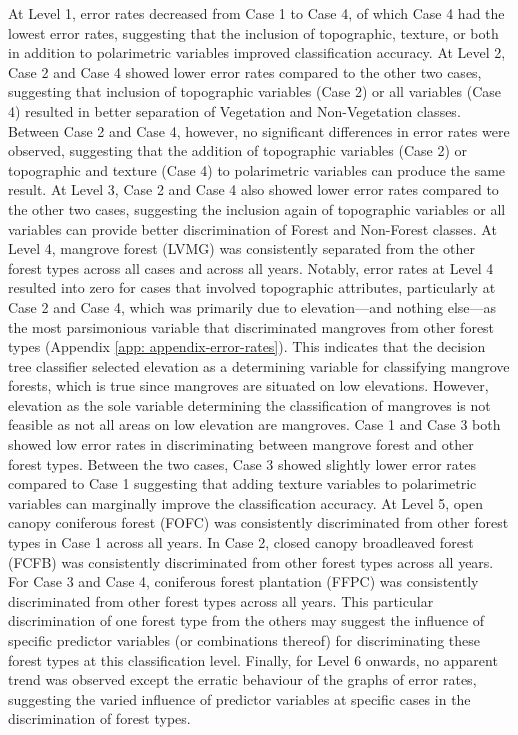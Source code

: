 At Level 1, error rates decreased from Case 1 to Case 4, of which Case 4 had the lowest error rates, suggesting that the inclusion of topographic, texture, or both in addition to polarimetric variables improved classification accuracy. At Level 2, Case 2 and Case 4 showed lower error rates compared to the other two cases, suggesting that inclusion of topographic variables (Case 2) or all variables (Case 4) resulted in better separation of Vegetation and Non-Vegetation classes. Between Case 2 and Case 4, however, no significant differences in error rates were observed, suggesting that the addition of topographic variables (Case 2) or topographic and texture (Case 4) to polarimetric variables can produce the same result. At Level 3, Case 2 and Case 4 also showed lower error rates compared to the other two cases, suggesting the inclusion again of topographic variables or all variables can provide better discrimination of Forest and Non-Forest classes. At Level 4, mangrove forest (LVMG) was consistently separated from the other forest types across all cases and across all years. Notably, error rates at Level 4 resulted into zero for cases that involved topographic attributes, particularly at Case 2 and Case 4, which was primarily due to elevation—and nothing else—as the most parsimonious variable that discriminated mangroves from other forest types (Appendix \ref{app: appendix-error-rates}). This indicates that the decision tree classifier selected elevation as a determining variable for classifying mangrove forests, which is true since mangroves are situated on low elevations. However, elevation as the sole variable determining the classification of mangroves is not feasible as not all areas on low elevation are mangroves. Case 1 and Case 3 both showed low error rates in discriminating between mangrove forest and other forest types. Between the two cases, Case 3 showed slightly lower error rates compared to Case 1 suggesting that adding texture variables to polarimetric variables can marginally improve the classification accuracy. At Level 5, open canopy coniferous forest (FOFC) was consistently discriminated from other forest types in Case 1 across all years. In Case 2, closed canopy broadleaved forest (FCFB) was consistently discriminated from other forest types across all years. For Case 3 and Case 4, coniferous forest plantation (FFPC) was consistently discriminated from other forest types across all years. This particular discrimination of one forest type from the others may suggest the influence of specific predictor variables (or combinations thereof) for discriminating these forest types at this classification level. Finally, for Level 6 onwards, no apparent trend was observed except the erratic behaviour of the graphs of error rates, suggesting the varied influence of predictor variables at specific cases in the discrimination of forest types.

